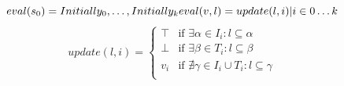 \[
eval(s_0) = {Initially_0,\ldots,Initially_k}\\
eval(v,l) = {update(l,i) | i \in 0\ldots k}
\]
\[
update(l,i)	=  \begin{cases}
\top & \text{if } \exists \alpha \in I_i: l \subseteq \alpha \\
\bot & \text{if } \exists \beta \in T_i: l \subseteq \beta \\
v_i & \text{if } \nexists \gamma \in I_i \cup T_i: l \subseteq \gamma \\
\end{cases}
\]